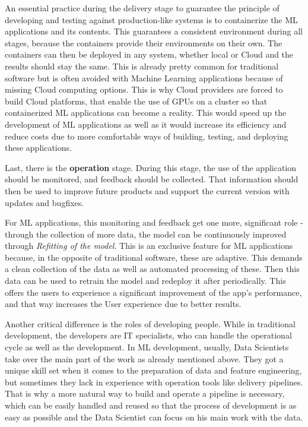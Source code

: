 \documentclass[12pt,english,a4paper,oneside,,tablecaptionabove]{scrbook}
\begin{document}
An essential practice during the delivery stage to guarantee the
principle of developing and testing against production-like systems is
to containerize the ML applications and its contents. This guarantees a
consistent environment during all stages, because the containers provide
their environments on their own. The containers can then be deployed in
any system, whether local or Cloud and the results should stay the same.
This is already pretty common for traditional software but is often
avoided with Machine Learning applications because of missing Cloud
computing options. This is why Cloud providers are forced to build Cloud
platforms, that enable the use of \acs{GPU}s on a cluster so that
containerized ML applications can become a reality. This would speed up
the development of ML applications as well as it would increase its
efficiency and reduce costs due to more comfortable ways of building,
testing, and deploying these applications.

Last, there is the \textbf{operation} stage. During this stage, the use
of the application should be monitored, and feedback should be
collected. That information should then be used to improve future
products and support the current version with updates and bugfixes.

For ML applications, this monitoring and feedback get one more,
significant role - through the collection of more data, the model can be
continuously improved through \emph{Refitting of the model}. This is an
exclusive feature for ML applications because, in the opposite of
traditional software, these are adaptive. This demands a clean
collection of the data as well as automated processing of these. Then
this data can be used to retrain the model and redeploy it after
periodically. This offers the users to experience a significant
improvement of the app's performance, and that way increases the User
experience due to better results.

Another critical difference is the roles of developing people. While in
traditional development, the developers are IT specialists, who can
handle the operational cycle as well as the development. In ML
development, usually, Data Scientists take over the main part of the
work as already mentioned above. They got a unique skill set when it
comes to the preparation of data and feature engineering, but sometimes
they lack in experience with operation tools like delivery pipelines.
That is why a more natural way to build and operate a pipeline is
necessary, which can be easily handled and reused so that the process of
development is as easy as possible and the Data Scientist can focus on
his main work with the data.
\end{document}
